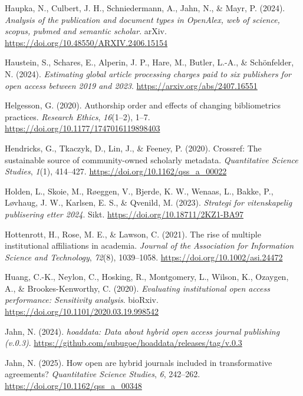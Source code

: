 \documentclass[a4paper,man,floatsintext,longtable,noextraspace,10pt]{apa6}
\newlength{\cslhangindent}
\newenvironment{CSLReferences}[2] %
{\begin{list}{}{%
  \setlength{\itemindent}{0pt}
  \setlength{\leftmargin}{0pt}
  \setlength{\parsep}{0pt}
  \ifodd #1
  \setlength{\leftmargin}{\cslhangindent}
  \setlength{\itemindent}{-1\cslhangindent}
  \fi
  \setlength{\itemsep}{#2\baselineskip}}}
{\end{list}}
\begin{document}
\begin{CSLReferences}{1}{0}
Haupka, N., Culbert, J. H., Schniedermann, A., Jahn, N., \& Mayr, P.
(2024). \emph{Analysis of the publication and document types in
OpenAlex, web of science, scopus, pubmed and semantic scholar}. arXiv.
\url{https://doi.org/10.48550/ARXIV.2406.15154}

Haustein, S., Schares, E., Alperin, J. P., Hare, M., Butler, L.-A., \&
Schönfelder, N. (2024). \emph{Estimating global article processing
charges paid to six publishers for open access between 2019 and 2023}.
\url{https://arxiv.org/abs/2407.16551}

Helgesson, G. (2020). Authorship order and effects of changing
bibliometrics practices. \emph{Research Ethics}, \emph{16}(1--2), 1--7.
\url{https://doi.org/10.1177/1747016119898403}

Hendricks, G., Tkaczyk, D., Lin, J., \& Feeney, P. (2020). Crossref: The
sustainable source of community-owned scholarly metadata.
\emph{Quantitative Science Studies}, \emph{1}(1), 414--427.
\url{https://doi.org/10.1162/qss_a_00022}

Holden, L., Skoie, M., Røeggen, V., Bjerde, K. W., Wenaas, L., Bakke,
P., Løvhaug, J. W., Karlsen, E. S., \& Qvenild, M. (2023).
\emph{Strategi for vitenskapelig publisering etter 2024}. Sikt.
\url{https://doi.org/10.18711/2KZ1-BA97}

Hottenrott, H., Rose, M. E., \& Lawson, C. (2021). The rise of multiple
institutional affiliations in academia. \emph{Journal of the Association
for Information Science and Technology}, \emph{72}(8), 1039--1058.
\url{https://doi.org/10.1002/asi.24472}

Huang, C.-K., Neylon, C., Hosking, R., Montgomery, L., Wilson, K.,
Ozaygen, A., \& Brookes-Kenworthy, C. (2020). \emph{Evaluating
institutional open access performance: Sensitivity analysis}. bioRxiv.
\url{https://doi.org/10.1101/2020.03.19.998542}

Jahn, N. (2024). \emph{{hoaddata}: Data about hybrid open access journal
publishing (v.0.3)}.
\url{https://github.com/subugoe/hoaddata/releases/tag/v.0.3}

Jahn, N. (2025). How open are hybrid journals included in transformative
agreements? \emph{Quantitative Science Studies}, \emph{6}, 242--262.
\url{https://doi.org/10.1162/qss_a_00348}


\end{CSLReferences}
\end{document}
